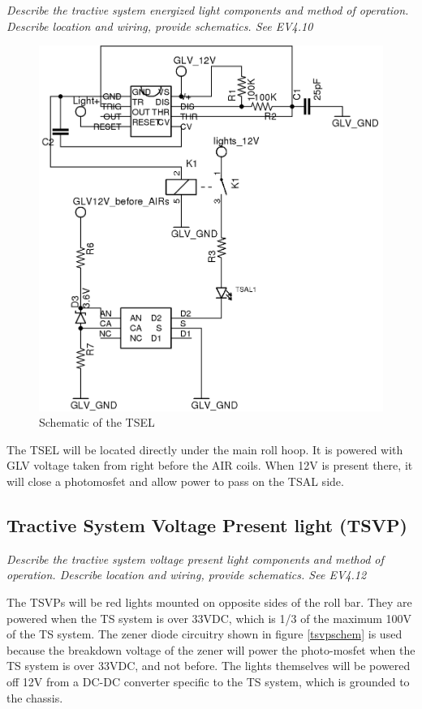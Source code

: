 \documentclass{article}
\begin{document}
\textit{Describe the tractive system energized light components and method of operation. Describe location and wiring, provide schematics. See EV4.10}

\begin{figure}[H]
    \centering
    \includegraphics[width = 0.7 \textwidth]{tsel_fh}
    \caption{Schematic of the TSEL}
    \label{tselschem}
\end{figure}

The TSEL will be located directly under the main roll hoop. It is powered with GLV voltage taken from right before the AIR coils. When 12V is present there, it will close a photomosfet and allow power to pass on the TSAL side.

\subsection{Tractive System Voltage Present light (TSVP)}

\textit{Describe the tractive system voltage present light components and method of operation. Describe location and wiring, provide schematics. See EV4.12}

The TSVPs will be red lights mounted on opposite sides of the roll bar. They are powered when the TS system is over 33VDC, which is 1/3 of the maximum 100V of the TS system. The zener diode circuitry shown in figure \ref{tsvpschem} is used because the breakdown voltage of the zener will power the photo-mosfet when the TS system is over 33VDC, and not before. The lights themselves will be powered off 12V from a DC-DC converter specific to the TS system, which is grounded to the chassis.
\end{document}
